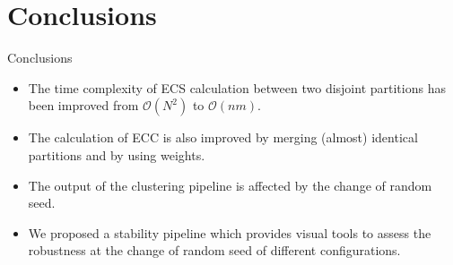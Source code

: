 \section{Conclusions}

\begin{frame}{Conclusions}
    \begin{itemize}
        \item The time complexity of ECS calculation between two disjoint partitions has been improved from $\mathcal{O}(N^2)$ to $\mathcal{O}(nm)$.
        \item The calculation of ECC is also improved by merging (almost) identical partitions and by using weights.
        \item The output of the clustering pipeline is affected by the change of random seed.
        \item We proposed a stability pipeline which provides visual tools to assess the robustness at the change of random seed of different configurations.
    \end{itemize}
\end{frame}